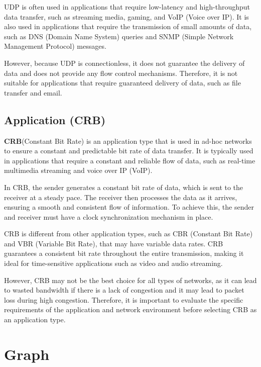 \documentclass[14pt]{scrartcl} %
\begin{document}
UDP is often used in applications that require low-latency and high-throughput data transfer, such as streaming media, gaming, and VoIP (Voice over IP). It is also used in applications that require the transmission of small amounts of data, such as DNS (Domain Name System) queries and SNMP (Simple Network Management Protocol) messages.

However, because UDP is connectionless, it does not guarantee the delivery of data and does not provide any flow control mechanisms. Therefore, it is not suitable for applications that require guaranteed delivery of data, such as file transfer and email.

\subsection{Application (CRB)}
\textbf{CRB}(Constant Bit Rate) is an application type that is used in ad-hoc networks to ensure a constant and predictable bit rate of data transfer. It is typically used in applications that require a constant and reliable flow of data, such as real-time multimedia streaming and voice over IP (VoIP).

In CRB, the sender generates a constant bit rate of data, which is sent to the receiver at a steady pace. The receiver then processes the data as it arrives, ensuring a smooth and consistent flow of information. To achieve this, the sender and receiver must have a clock synchronization mechanism in place.

CRB is different from other application types, such as CBR (Constant Bit Rate) and VBR (Variable Bit Rate), that may have variable data rates. CRB guarantees a consistent bit rate throughout the entire transmission, making it ideal for time-sensitive applications such as video and audio streaming.

However, CRB may not be the best choice for all types of networks, as it can lead to wasted bandwidth if there is a lack of congestion and it may lead to packet loss during high congestion. Therefore, it is important to evaluate the specific requirements of the application and network environment before selecting CRB as an application type.

\section{Graph}
\end{document}
